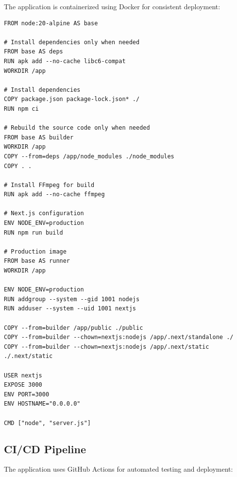 \documentclass[12pt,a4paper]{article}
\begin{document}
The application is containerized using Docker for consistent deployment:

\begin{lstlisting}[caption=Dockerfile Configuration]
FROM node:20-alpine AS base

# Install dependencies only when needed
FROM base AS deps
RUN apk add --no-cache libc6-compat
WORKDIR /app

# Install dependencies
COPY package.json package-lock.json* ./
RUN npm ci

# Rebuild the source code only when needed
FROM base AS builder
WORKDIR /app
COPY --from=deps /app/node_modules ./node_modules
COPY . .

# Install FFmpeg for build
RUN apk add --no-cache ffmpeg

# Next.js configuration
ENV NODE_ENV=production
RUN npm run build

# Production image
FROM base AS runner
WORKDIR /app

ENV NODE_ENV=production
RUN addgroup --system --gid 1001 nodejs
RUN adduser --system --uid 1001 nextjs

COPY --from=builder /app/public ./public
COPY --from=builder --chown=nextjs:nodejs /app/.next/standalone ./
COPY --from=builder --chown=nextjs:nodejs /app/.next/static ./.next/static

USER nextjs
EXPOSE 3000
ENV PORT=3000
ENV HOSTNAME="0.0.0.0"

CMD ["node", "server.js"]
\end{lstlisting}

\subsection{CI/CD Pipeline}

The application uses GitHub Actions for automated testing and deployment:
\end{document}
